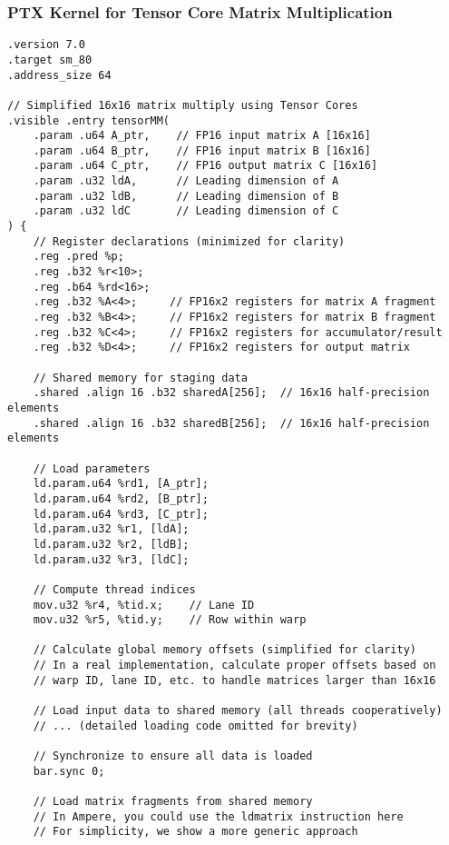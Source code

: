 \subsubsection{PTX Kernel for Tensor Core Matrix Multiplication}

\begin{lstlisting}[style=ptx]
.version 7.0
.target sm_80
.address_size 64

// Simplified 16x16 matrix multiply using Tensor Cores
.visible .entry tensorMM(
    .param .u64 A_ptr,    // FP16 input matrix A [16x16]
    .param .u64 B_ptr,    // FP16 input matrix B [16x16]
    .param .u64 C_ptr,    // FP16 output matrix C [16x16]
    .param .u32 ldA,      // Leading dimension of A
    .param .u32 ldB,      // Leading dimension of B
    .param .u32 ldC       // Leading dimension of C
) {
    // Register declarations (minimized for clarity)
    .reg .pred %p;
    .reg .b32 %r<10>;
    .reg .b64 %rd<16>;
    .reg .b32 %A<4>;     // FP16x2 registers for matrix A fragment
    .reg .b32 %B<4>;     // FP16x2 registers for matrix B fragment
    .reg .b32 %C<4>;     // FP16x2 registers for accumulator/result
    .reg .b32 %D<4>;     // FP16x2 registers for output matrix
    
    // Shared memory for staging data
    .shared .align 16 .b32 sharedA[256];  // 16x16 half-precision elements
    .shared .align 16 .b32 sharedB[256];  // 16x16 half-precision elements
    
    // Load parameters
    ld.param.u64 %rd1, [A_ptr];
    ld.param.u64 %rd2, [B_ptr];
    ld.param.u64 %rd3, [C_ptr];
    ld.param.u32 %r1, [ldA];
    ld.param.u32 %r2, [ldB];
    ld.param.u32 %r3, [ldC];
    
    // Compute thread indices
    mov.u32 %r4, %tid.x;    // Lane ID
    mov.u32 %r5, %tid.y;    // Row within warp
    
    // Calculate global memory offsets (simplified for clarity)
    // In a real implementation, calculate proper offsets based on
    // warp ID, lane ID, etc. to handle matrices larger than 16x16
    
    // Load input data to shared memory (all threads cooperatively)
    // ... (detailed loading code omitted for brevity)
    
    // Synchronize to ensure all data is loaded
    bar.sync 0;
    
    // Load matrix fragments from shared memory
    // In Ampere, you could use the ldmatrix instruction here
    // For simplicity, we show a more generic approach
    

\end{lstlisting}
